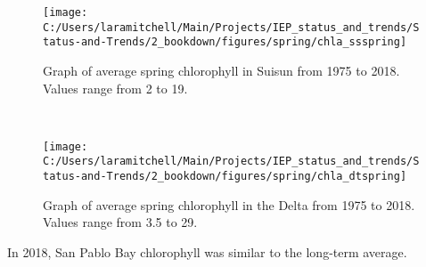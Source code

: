 \documentclass[
]{book}
\begin{document}
\begin{panel-grid}
\begin{columns-nocenter}
\begin{column40}
\end{column40}

\begin{column800}

\begin{expand}

\begin{figure}
\texttt{[image: C:/Users/laramitchell/Main/Projects/IEP\_status\_and\_trends/Status-and-Trends/2\_bookdown/figures/spring/chla\_ssspring]} \caption{Graph of average spring chlorophyll in Suisun from 1975 to 2018. Values range from 2 to 19.}\label{fig:unnamed-chunk-21}
\end{figure}

\end{expand}

\end{column800}

\begin{column40}

~

\end{column40}

\begin{column800}

\begin{expand}

\begin{figure}
\texttt{[image: C:/Users/laramitchell/Main/Projects/IEP\_status\_and\_trends/Status-and-Trends/2\_bookdown/figures/spring/chla\_dtspring]} \caption{Graph of average spring chlorophyll in the Delta from 1975 to 2018. Values range from 3.5 to 29.}\label{fig:unnamed-chunk-22}
\end{figure}

\end{expand}

\end{column800}

\end{columns-nocenter}

\begin{columns-nocenter}

\begin{column800}

In 2018, San Pablo Bay chlorophyll was similar to the long-term average.

\end{column800}

\begin{column40}

~


\end{column40}
\end{columns-nocenter}
\end{panel-grid}
\end{document}
